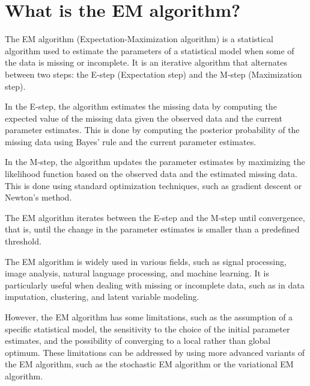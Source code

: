 \section{What is the EM algorithm?}
The EM algorithm (Expectation-Maximization algorithm) is a statistical algorithm used to estimate the parameters of a statistical model when some of the data is missing or incomplete. It is an iterative algorithm that alternates between two steps: the E-step (Expectation step) and the M-step (Maximization step).

In the E-step, the algorithm estimates the missing data by computing the expected value of the missing data given the observed data and the current parameter estimates. This is done by computing the posterior probability of the missing data using Bayes' rule and the current parameter estimates.

In the M-step, the algorithm updates the parameter estimates by maximizing the likelihood function based on the observed data and the estimated missing data. This is done using standard optimization techniques, such as gradient descent or Newton's method.

The EM algorithm iterates between the E-step and the M-step until convergence, that is, until the change in the parameter estimates is smaller than a predefined threshold.

The EM algorithm is widely used in various fields, such as signal processing, image analysis, natural language processing, and machine learning. It is particularly useful when dealing with missing or incomplete data, such as in data imputation, clustering, and latent variable modeling.

However, the EM algorithm has some limitations, such as the assumption of a specific statistical model, the sensitivity to the choice of the initial parameter estimates, and the possibility of converging to a local rather than global optimum. These limitations can be addressed by using more advanced variants of the EM algorithm, such as the stochastic EM algorithm or the variational EM algorithm.

